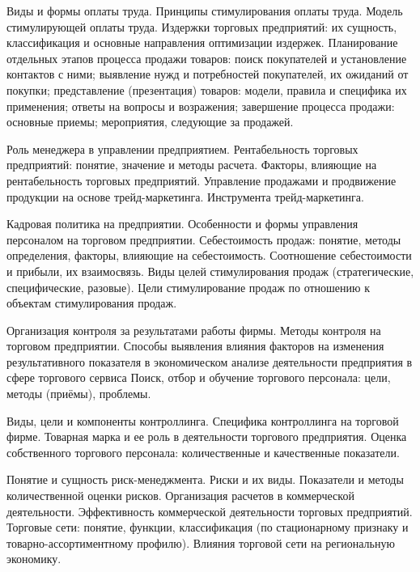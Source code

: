 \documentclass[
	11pt,
	a4paper,
	]
	{article}
\begin{document}
\bigskip

\noindent{} 
	{
		Виды и формы оплаты труда. Принципы стимулирования оплаты труда. Модель стимулирующей оплаты труда.
	}{
		Издержки торговых предприятий: их сущность, классификация и основные направления оптимизации издержек.
	}{
		Планирование отдельных этапов процесса продажи товаров: поиск покупателей и установление контактов с ними; выявление нужд и потребностей покупателей, их ожиданий от покупки; представление (презентация) товаров: модели, правила и специфика их применения; ответы на вопросы и возражения; завершение процесса продажи: основные приемы; мероприятия, следующие за продажей.
	}

\bigskip

\noindent{} 
	{
		Роль менеджера в управлении предприятием.
	}{
		Рентабельность торговых предприятий: понятие, значение и методы расчета. Факторы, влияющие на рентабельность торговых предприятий.
	}{
		Управление продажами и продвижение продукции на основе трейд-маркетинга. Инструмента трейд-маркетинга.
	}

\bigskip

\noindent{} 
	{
		Кадровая политика на предприятии. Особенности и формы управления персоналом на торговом предприятии.
	}{
		Себестоимость продаж: понятие, методы определения, факторы, влияющие на себестоимость. Соотношение себестоимости и прибыли, их взаимосвязь.
	}{
		Виды целей стимулирования продаж (стратегические, специфические, разовые). Цели стимулирование продаж по отношению к объектам стимулирования продаж.
	}

\bigskip

\noindent{} 
	{
		Организация контроля за результатами работы фирмы. Методы контроля на торговом предприятии.
	}{
		Способы выявления влияния факторов на изменения результативного показателя в экономическом анализе деятельности предприятия в сфере торгового сервиса
	}{
		Поиск, отбор и обучение торгового персонала: цели, методы (приёмы), проблемы.
	}

\bigskip

\noindent{} 
	{
		Виды, цели и компоненты контроллинга. Специфика контроллинга на торговой фирме.
	}{
		Товарная марка и ее роль в деятельности торгового предприятия.
	}{
		Оценка собственного торгового персонала: количественные и качественные показатели.
	}

\bigskip

\noindent{} 
	{
		Понятие и сущность риск-менеджмента. Риски и их виды. Показатели и методы количественной оценки рисков.
	}{
		Организация расчетов в коммерческой деятельности. Эффективность коммерческой деятельности торговых предприятий.
	}{
		Торговые сети: понятие, функции, классификация (по стационарному признаку и товарно-ассортиментному профилю). Влияния торговой сети на региональную экономику.
	}
\end{document}
